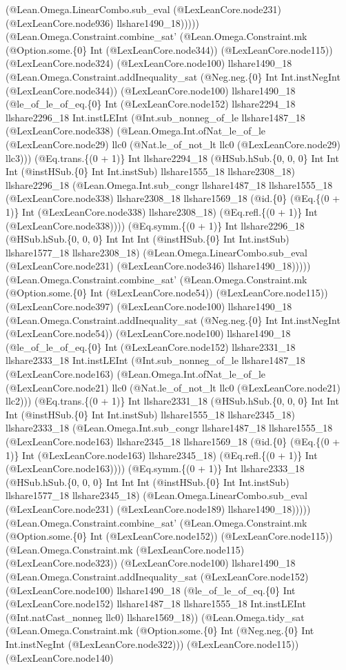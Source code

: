 \documentclass[11pt]{article}
\begin{document}
(@Lean.Omega.LinearCombo.sub\_eval (@LexLeanCore.node231) (@LexLeanCore.node936) llshare1490\_18))))) (@Lean.Omega.Constraint.combine\_sat' (@Lean.Omega.Constraint.mk (@Option.some.\{0\} Int (@LexLeanCore.node344)) (@LexLeanCore.node115)) (@LexLeanCore.node324) (@LexLeanCore.node100) llshare1490\_18 (@Lean.Omega.Constraint.addInequality\_sat (@Neg.neg.\{0\} Int Int.instNegInt (@LexLeanCore.node344)) (@LexLeanCore.node100) llshare1490\_18 (@le\_of\_le\_of\_eq.\{0\} Int (@LexLeanCore.node152) llshare2294\_18 llshare2296\_18 Int.instLEInt (@Int.sub\_nonneg\_of\_le llshare1487\_18 (@LexLeanCore.node338) (@Lean.Omega.Int.ofNat\_le\_of\_le (@LexLeanCore.node29) llc0 (@Nat.le\_of\_not\_lt llc0 (@LexLeanCore.node29) llc3))) (@Eq.trans.\{(0 + 1)\} Int llshare2294\_18 (@HSub.hSub.\{0, 0, 0\} Int Int Int (@instHSub.\{0\} Int Int.instSub) llshare1555\_18 llshare2308\_18) llshare2296\_18 (@Lean.Omega.Int.sub\_congr llshare1487\_18 llshare1555\_18 (@LexLeanCore.node338) llshare2308\_18 llshare1569\_18 (@id.\{0\} (@Eq.\{(0 + 1)\} Int (@LexLeanCore.node338) llshare2308\_18) (@Eq.refl.\{(0 + 1)\} Int (@LexLeanCore.node338)))) (@Eq.symm.\{(0 + 1)\} Int llshare2296\_18 (@HSub.hSub.\{0, 0, 0\} Int Int Int (@instHSub.\{0\} Int Int.instSub) llshare1577\_18 llshare2308\_18) (@Lean.Omega.LinearCombo.sub\_eval (@LexLeanCore.node231) (@LexLeanCore.node346) llshare1490\_18))))) (@Lean.Omega.Constraint.combine\_sat' (@Lean.Omega.Constraint.mk (@Option.some.\{0\} Int (@LexLeanCore.node54)) (@LexLeanCore.node115)) (@LexLeanCore.node397) (@LexLeanCore.node100) llshare1490\_18 (@Lean.Omega.Constraint.addInequality\_sat (@Neg.neg.\{0\} Int Int.instNegInt (@LexLeanCore.node54)) (@LexLeanCore.node100) llshare1490\_18 (@le\_of\_le\_of\_eq.\{0\} Int (@LexLeanCore.node152) llshare2331\_18 llshare2333\_18 Int.instLEInt (@Int.sub\_nonneg\_of\_le llshare1487\_18 (@LexLeanCore.node163) (@Lean.Omega.Int.ofNat\_le\_of\_le (@LexLeanCore.node21) llc0 (@Nat.le\_of\_not\_lt llc0 (@LexLeanCore.node21) llc2))) (@Eq.trans.\{(0 + 1)\} Int llshare2331\_18 (@HSub.hSub.\{0, 0, 0\} Int Int Int (@instHSub.\{0\} Int Int.instSub) llshare1555\_18 llshare2345\_18) llshare2333\_18 (@Lean.Omega.Int.sub\_congr llshare1487\_18 llshare1555\_18 (@LexLeanCore.node163) llshare2345\_18 llshare1569\_18 (@id.\{0\} (@Eq.\{(0 + 1)\} Int (@LexLeanCore.node163) llshare2345\_18) (@Eq.refl.\{(0 + 1)\} Int (@LexLeanCore.node163)))) (@Eq.symm.\{(0 + 1)\} Int llshare2333\_18 (@HSub.hSub.\{0, 0, 0\} Int Int Int (@instHSub.\{0\} Int Int.instSub) llshare1577\_18 llshare2345\_18) (@Lean.Omega.LinearCombo.sub\_eval (@LexLeanCore.node231) (@LexLeanCore.node189) llshare1490\_18))))) (@Lean.Omega.Constraint.combine\_sat' (@Lean.Omega.Constraint.mk (@Option.some.\{0\} Int (@LexLeanCore.node152)) (@LexLeanCore.node115)) (@Lean.Omega.Constraint.mk (@LexLeanCore.node115) (@LexLeanCore.node323)) (@LexLeanCore.node100) llshare1490\_18 (@Lean.Omega.Constraint.addInequality\_sat (@LexLeanCore.node152) (@LexLeanCore.node100) llshare1490\_18 (@le\_of\_le\_of\_eq.\{0\} Int (@LexLeanCore.node152) llshare1487\_18 llshare1555\_18 Int.instLEInt (@Int.natCast\_nonneg llc0) llshare1569\_18)) (@Lean.Omega.tidy\_sat (@Lean.Omega.Constraint.mk (@Option.some.\{0\} Int (@Neg.neg.\{0\} Int Int.instNegInt (@LexLeanCore.node322))) (@LexLeanCore.node115)) (@LexLeanCore.node140) 
\end{document}

